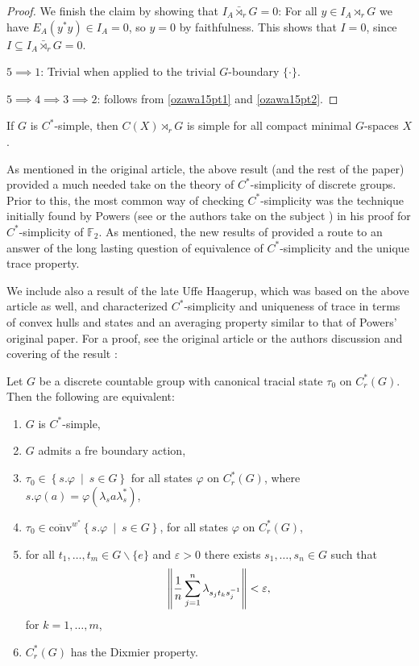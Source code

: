 \begin{proof}
	We finish the claim by showing that $I_A \bar \rtimes_r G = 0$: For all $y \in I_A \rtimes_r G$ we have $E_A(y^*y) \in I_A = 0$, so $y = 0$ by faithfulness. This shows that $I = 0$, since $I \subseteq I_A \bar \rtimes_r G = 0$.

	$5 \implies 1$: Trivial when applied to the trivial $G$-boundary $\{\cdot\}$.

	$5 \implies 4 \implies 3 \implies 2$: follows from \cref{ozawa15pt1} and \cref{ozawa15pt2}.
\end{proof}
\begin{corollary}
	If $G$ is $C^*$-simple, then $C(X) \rtimes_{r}G$ is simple for all compact minimal $G$-spaces $X$.
\end{corollary}
\begin{note}
	As mentioned in the original article, the above result (and the rest of the paper) provided a much needed take on the theory of $C^*$-simplicity of discrete groups. Prior to this, the most common way of checking $C^*$-simplicity was the technique initially found by Powers (see \cite{powers1975simplicity} or the authors take on the subject \cite[chapter 3]{bscp}) in his proof for $C^*$-simplicity of $\mathbb{F}_2$. As mentioned, the new results of \cite{breuillard2017c} provided a route to an answer of the long lasting question of equivalence of $C^*$-simplicity and the unique trace property.
\end{note}
We include also a result of the late Uffe Haagerup, which was based on the above article as well, and characterized $C^*$-simplicity and uniqueness of trace in terms of convex hulls and states and an averaging property similar to that of Powers' original paper. For a proof, see the original article \cite{haagerup2015new} or the authors discussion and covering of the result \cite[Chapter 5]{bscp}:
\begin{theorem}
	Let $G$ be a discrete countable group with canonical tracial state $\tau_0$ on $C_r^*(G)$. Then the following are equivalent:
	\begin{enumerate}
		\item $G$ is $C^*$-simple,
		\item $G$ admits a fre boundary action,
		\item $\tau_0 \in \left\{ s.\varphi \ \mid \ s \in G \right\}$ for all states $\varphi $ on $C_r^*(G)$, where $s.\varphi(a) = \varphi(\lambda_s a \lambda_s^*)$,
		\item $\tau_0 \in \overline{\mathrm{conv}}^{w^*}\left\{ s . \varphi \ \mid \ s \in G \right\}$, for all states $\varphi$ on $C_r^*(G)$,
		\item for all $t_1,\dots,t_m \in G\backslash\{e\}$ and $\varepsilon > 0$ there exists $s_1,\dots,s_n \in G$ such that
			\begin{align*}
				\left\lVert \frac1n \sum_{j=1}^n \lambda_{s_jt_ks_j^{-1}}\right\rVert < \varepsilon,
			\end{align*}
			for $k=1,\dots,m$,
		\item $C_r^*(G)$ has the Dixmier property.
	\end{enumerate}
	\label{uffecsimple}
\end{theorem}


